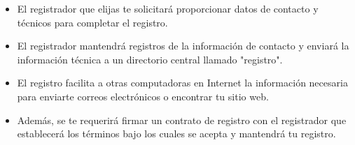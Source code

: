 \documentclass[11pt]{article}
\begin{document}
\begin{description}
\begin{itemize}
\item El registrador que elijas te solicitará proporcionar datos de
contacto y técnicos para completar el registro.

\item El registrador mantendrá registros de la información de contacto y
enviará la información técnica a un directorio central llamado
"registro".

\item El registro facilita a otras computadoras en Internet la
información necesaria para enviarte correos electrónicos o
encontrar tu sitio web.

\item Además, se te requerirá firmar un contrato de registro con el
registrador que establecerá los términos bajo los cuales se acepta
y mantendrá tu registro.
\end{itemize}
\end{description}
\end{document}
